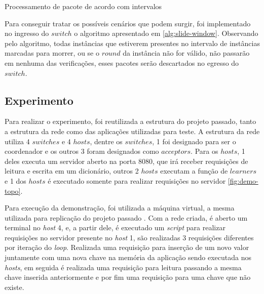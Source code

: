 \documentclass[
    12pt,
    openright, 
    oneside,
    a4paper,
    french,
    english,
    brazil
    ]{facom-ufu-abntex2}
\theoremstyle{definition}
\begin{document}
\begin{algorithm}[H]
\label{alg:slide-window}
\caption{Processamento de pacote de acordo com intervalos}
\SetAlgoLined
{}
\end{algorithm}

Para conseguir tratar os possíveis cenários que podem surgir, foi implementado no ingresso do $switch$ o algoritmo
apresentado em \ref{alg:slide-window}. Observando pelo algoritmo, todas instâncias que estiverem presentes no intervalo de 
instâncias marcadas para morrer, ou se o $round$ da instância não for válido, não passarão em nenhuma das verificações, esses 
pacotes serão descartados no egresso do $switch$.


\subsection{Experimento}
Para realizar o experimento, foi reutilizada a estrutura do projeto passado, tanto a estrutura da rede como das 
aplicações utilizadas para teste. A estrutura da rede utiliza 4 $switches$ e 4 $hosts$,
dentre os $switches$, 1 foi designado para ser o coordenador e os outros 3 foram designados como $acceptors$.
Para os $hosts$, 1 deles executa um servidor aberto na porta 8080, que irá receber requisições de leitura
e escrita em um dicionário, outros 2 $hosts$ executam a função de $learners$ e 1 dos $hosts$ é executado
somente para realizar requisições no servidor \ref{fig:demo-topo}.

Para execução da demonstração, foi utilizada a máquina virtual, a mesma utilizada para replicação do projeto
passado \cite{dang2016paxos}. Com a rede criada, é aberto um terminal no \textit{host} 4, e, a partir dele,
é executado um \textit{script} para realizar requisições no servidor presente no \textit{host} 1, são realizadas
3 requisições diferentes por iteração do \textit{loop}. Realizada uma requisição para inserção de um novo valor juntamente
com uma nova chave na memória da aplicação sendo executada nos \textit{hosts}, em seguida é realizada uma requisição para 
leitura passando a mesma chave inserida anteriormente e por fim uma requisição para uma chave que não existe.
\end{document}
